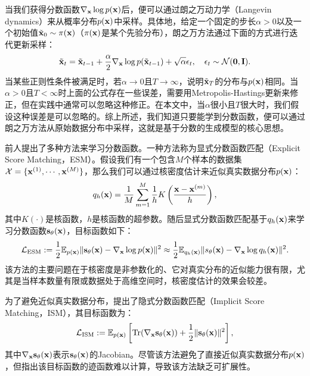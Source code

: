 \documentclass[11pt,a4paper,UTF8]{ctexart}
\begin{document}
当我们获得分数函数$\nabla_{\mathbf{x}}\log p(\mathbf{x})$后，便可以通过朗之万动力学（Langevin dynamics）来从概率分布$p(\mathbf{x})$中采样。具体地，给定一个固定的步长$\alpha>0$以及一个初始值$\tilde{\mathbf{x}}_0\sim\pi(\mathbf{x})$（$\pi(\mathbf{x})$是某个先验分布），朗之万方法通过下面的方式进行迭代更新采样：
\begin{equation*}
    \tilde{\mathbf{x}}_t = \tilde{\mathbf{x}}_{t-1} + \frac{\alpha}{2} \nabla_{\mathbf{x}}\log p(\tilde{\mathbf{x}}_{t-1}) + \sqrt{\alpha}\epsilon_t,\quad \epsilon_t\sim\mathcal{N}(\mathbf{0},\mathbf{I}).
\end{equation*}
当某些正则性条件被满足时，若$\alpha\rightarrow 0$且$T\rightarrow \infty$，\cite{max2011bayesian}说明$\tilde{\mathbf{x}}_T$的分布与$p(\mathbf{x})$相同。当$\alpha> 0$且$T< \infty$时上面的公式存在一些误差，需要用Metropolis-Hastings更新来修正，但在实践中通常可以忽略这种修正\cite{du2019implicit,nijkamp2019anatomy}。在本文中，当$\alpha$很小且$T$很大时，我们假设这种误差是可以忽略的。综上所述，我们知道只要能学到分数函数，便可以通过朗之万方法从原始数据分布中采样，这就是基于分数的生成模型的核心思想。

前人提出了多种方法来学习分数函数。一种方法称为显式分数函数匹配（Explicit Score Matching，ESM）\cite{vincent2011connection}。假设我们有一个包含$M$个样本的数据集$\mathcal{X}=\{\mathbf{x}^{(1)},\cdots,\mathbf{x}^{(M)}\}$，那么我们可以通过核密度估计来近似真实数据分布$p(\mathbf{x})$：
\begin{equation*}
    q_h(\mathbf{x})=\frac{1}{M}\sum_{m=1}^M \frac{1}{h} K\left(\frac{\mathbf{x}-\mathbf{x}^{(m)}}{h} \right),
\end{equation*}
其中$K(\cdot)$是核函数，$h$是核函数的超参数。随后显式分数函数匹配基于$q_h(\mathbf{x})$来学习分数函数$\mathbf{s}_\theta(\mathbf{x})$，目标函数如下：
\begin{equation*}
    \mathcal{L}_{\text{ESM}}:=\frac{1}{2}\mathbb{E}_{p(\mathbf{x})} \|\mathbf{s}_\theta(\mathbf{x})-\nabla_{\mathbf{x}}\log p(\mathbf{x}) \|^2 \approx \frac{1}{2}\mathbb{E}_{q_h(\mathbf{x})} \| s_\theta(\mathbf{x})-\nabla_{\mathbf{x}}\log q_h(\mathbf{x})\|^2.
\end{equation*}
该方法的主要问题在于核密度是非参数化的、它对真实分布的近似能力很有限，尤其是当样本数量有限或数据处于高维空间时，核密度估计的效果会较差。

为了避免近似真实数据分布，\cite{Hyvrinen2005EstimationON}提出了隐式分数函数匹配（Implicit Score Matching，ISM），其目标函数为：
\begin{equation*}
    \mathcal{L}_{\text{ISM}}:=\mathbb{E}_{p(\mathbf{x})} \left[\text{Tr}(\nabla_{\mathbf{x}} \mathbf{s}_\theta (\mathbf{x})) + \frac{1}{2}\|\mathbf{s}_\theta (\mathbf{x}) \|^2 \right],
\end{equation*}
其中$\nabla_{\mathbf{x}} \mathbf{s}_\theta (\mathbf{x})$表示$\mathbf{s}_\theta (\mathbf{x})$的Jacobian。尽管该方法避免了直接近似真实数据分布$p(\mathbf{x})$，但\cite{song2019generative}指出该目标函数的迹函数难以计算，导致该方法缺乏可扩展性。
\end{document}

